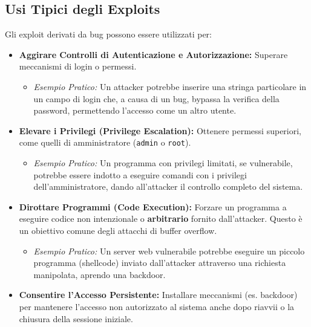 \subsection{Usi Tipici degli Exploits}
Gli exploit derivati da bug possono essere utilizzati per:
\begin{itemize}
    \item \textbf{Aggirare Controlli di Autenticazione e Autorizzazione:}
    Superare meccanismi di login o permessi.
    \begin{itemize}
        \item \textit{Esempio Pratico:} Un attacker potrebbe inserire una stringa particolare in un campo di login che, a causa di un bug, bypassa la verifica della password, permettendo l'accesso come un altro utente.
    \end{itemize}

    \item \textbf{Elevare i Privilegi (Privilege Escalation):}
    Ottenere permessi superiori, come quelli di amministratore (\texttt{admin} o \texttt{root}).
    \begin{itemize}
        \item \textit{Esempio Pratico:} Un programma con privilegi limitati, se vulnerabile, potrebbe essere indotto a eseguire comandi con i privilegi dell'amministratore, dando all'attacker il controllo completo del sistema.
    \end{itemize}

    \item \textbf{Dirottare Programmi (Code Execution):}
    Forzare un programma a eseguire codice non intenzionale o \textbf{arbitrario} fornito dall'attacker. Questo è un obiettivo comune degli attacchi di buffer overflow.
    \begin{itemize}
        \item \textit{Esempio Pratico:} Un server web vulnerabile potrebbe eseguire un piccolo programma (shellcode) inviato dall'attacker attraverso una richiesta manipolata, aprendo una backdoor.
    \end{itemize}

    \item \textbf{Consentire l'Accesso Persistente:}
    Installare meccanismi (es. backdoor) per mantenere l'accesso non autorizzato al sistema anche dopo riavvii o la chiusura della sessione iniziale.
\end{itemize}

